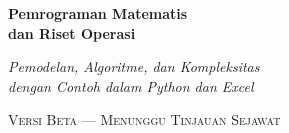 
\begin{titlepage}
\thispagestyle{empty}
\begingroup
\pagecolor{white}
\centering

\vspace*{0.5in}

{\fontsize{30}{36}\selectfont\bfseries
  Pemrograman Matematis\\[2pt]
  dan Riset Operasi\par}

\vspace{0.25in}

{\fontsize{14}{18}\selectfont\itshape
  Pemodelan, Algoritme, dan Kompleksitas\\
  dengan Contoh dalam Python dan Excel\par}

\vspace{0.2in}

{\fontsize{11}{14}\selectfont\scshape\color{chaptertitlecolour}
  Versi Beta --- Menunggu Tinjauan Sejawat\par}

\vspace{0.3in}

\end{titlepage}
